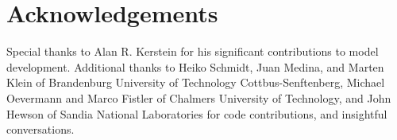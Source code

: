 \documentclass[preprint,12pt, a4paper]{elsarticle}
\begin{document}
\section*{Acknowledgements}
\label{acknowledgements}

Special thanks to Alan R. Kerstein for his significant contributions to model development. Additional thanks to Heiko Schmidt, Juan Medina, and Marten Klein of Brandenburg University of Technology Cottbus-Senftenberg, Michael Oevermann and Marco Fistler of Chalmers University of Technology, and John Hewson of Sandia National Laboratories for code contributions, and insightful conversations.



\end{document}

